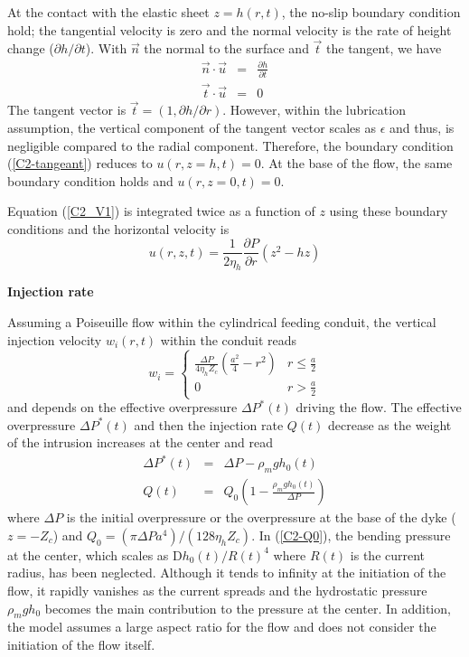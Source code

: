 At the contact with the elastic sheet $z=h(r,t)$, the no-slip boundary
condition  hold;  the  tangential  velocity is  zero  and  the  normal
velocity  is the  rate of  height change  ($\partial h/  \partial t$).
With $\vec{n}$ the normal to the surface and $\vec{t}$ the tangent, we
have
\begin{eqnarray}
  \vec{n} \cdot \vec{u} &=& \frac{\partial h }{\partial t}\\
  \vec{t} \cdot \vec{u} &=& 0 \label{C2-tangeant}
\end{eqnarray}
The  tangent  vector is  $\vec{t}  =  (1,  \partial h/  \partial  r)$.
However, within the lubrication  assumption, the vertical component of
the  tangent  vector scales  as  $\epsilon$  and thus,  is  negligible
compared to  the radial  component. Therefore, the  boundary condition
(\ref{C2-tangeant}) reduces  to $u(r,z=h,t) =0$.   At the base  of the
flow, the same boundary condition holds and $u(r,z=0,t) =0$.

Equation (\ref{C2_V1}) is integrated twice  as a function of $z$ using
these boundary conditions and the horizontal velocity is
\begin{equation}
  u(r,z,t) =\frac{1}{2\eta_h} \frac{\partial P}{\partial r} \left(z^2-hz\right)
  \label{C2-vel}
\end{equation}

\vspace{.5cm} \textbf{Injection rate} \vspace{.5cm}

Assuming a Poiseuille flow within the cylindrical feeding conduit, the
vertical injection velocity $w_i(r,t)$ within the conduit reads
\begin{equation}
  w_i=
  \begin{cases}
    \frac{ \Delta P}{4 \eta_h Z_{c}} (\frac{a^{2}}{4}-r^{2})& r \le \frac{a}{2}\\
    0 & r > \frac{a}{2}
  \end{cases}
  \label{C2-eq12}
\end{equation}
and depends on the effective  overpressure $\Delta P^*(t)$ driving the
flow.   The  effective  overpressure  $\Delta  P^*(t)$  and  then  the
injection  rate  $Q(t)$  decrease  as  the  weight  of  the  intrusion
increases at the center and read
\begin{eqnarray}
  \Delta P^*(t) &=& \Delta P -\rho_m g h_0(t) \label{C2-Q0}\\
  Q(t) &=& Q_0(1-\frac{\rho_m g h_0(t)}{\Delta P}) \label{C2-eq11}
\end{eqnarray}
where $\Delta  P$ is the  initial overpressure or the  overpressure at
the       base       of       the      dyke       ($z=-Z_c$)       and
$Q_0=\left(\pi \Delta P a^{4}\right)/\left(128 \eta_h Z_c\right)$.  In
(\ref{C2-Q0}), the  bending pressure  at the  center, which  scales as
D$h_0(t)/R(t)^4$  where  $R(t)$  is   the  current  radius,  has  been
neglected.  Although  it tends  to infinity at  the initiation  of the
flow, it rapidly  vanishes as the current spreads  and the hydrostatic
pressure $\rho_m g h_0$ becomes  the main contribution to the pressure
at the  center.  In addition, the  model assumes a large  aspect ratio
for the flow and does not consider the initiation of the flow itself.

